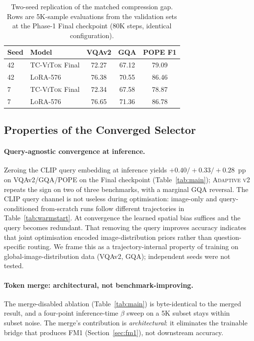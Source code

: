 \documentclass[runningheads]{llncs}
\begin{document}
\begin{table}[t]
\caption{Two-seed replication of the matched compression gap. Rows are
5K-sample evaluations from the validation sets at the Phase-1 Final
checkpoint (80K steps, identical configuration).}
\label{tab:seed-replication}
\centering
\small
\renewcommand{\arraystretch}{1.05}
\begin{tabular}{llccc}
\toprule
\textbf{Seed} & \textbf{Model} & \textbf{VQAv2} & \textbf{GQA} & \textbf{POPE F1} \\
\midrule
42 & \textsc{TC-ViTok} Final & 72.27 & 67.12 & 79.09 \\
42 & \textsc{LoRA-576}       & 76.38 & 70.55 & 86.46 \\
 7 & \textsc{TC-ViTok} Final & 72.34 & 67.58 & 78.87 \\
 7 & \textsc{LoRA-576}       & 76.65 & 71.36 & 86.78 \\
\bottomrule
\end{tabular}
\end{table}

\subsection{Properties of the Converged Selector}
\label{sec:selector-properties}

\paragraph{Query-agnostic convergence at inference.}
Zeroing the CLIP query embedding at inference yields
$+0.40/+0.33/+0.28$~pp on VQAv2/GQA/POPE on the Final checkpoint
(Table~\ref{tab:main}); \textsc{Adaptive v2} repeats the sign on two
of three benchmarks, with a marginal GQA reversal. The CLIP query
channel is not useless during optimisation: image-only and
query-conditioned from-scratch runs follow different trajectories in
Table~\ref{tab:warmstart}. At convergence the learned spatial bias
suffices and the query becomes redundant. That removing the query
improves accuracy indicates that joint
optimisation encoded image-distribution priors rather than
question-specific routing. We frame this as a trajectory-internal
property of training on global-image-distribution data (VQAv2, GQA);
independent seeds were not tested.

\paragraph{Token merge: architectural, not benchmark-improving.}
The merge-disabled ablation (Table~\ref{tab:main}) is byte-identical
to the merged result, and a four-point inference-time $\beta$ sweep on
a 5K subset stays within subset noise. The merge's contribution is
\emph{architectural}: it eliminates the trainable bridge that produces
FM1 (Section~\ref{sec:fm1}), not downstream accuracy.
\end{document}
